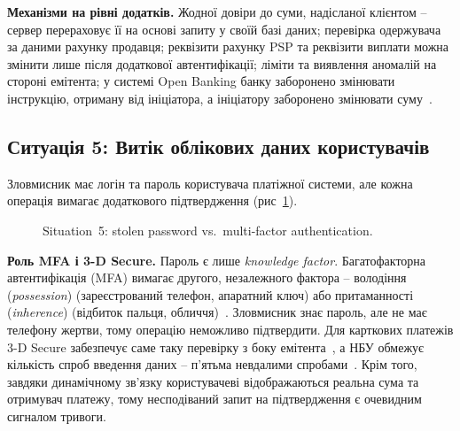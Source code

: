\textbf{Механізми на рівні додатків.} Жодної довіри до суми, надісланої клієнтом -- сервер перераховує її на основі 
запиту у своїй базі даних; перевірка одержувача за даними рахунку продавця; реквізити рахунку PSP та реквізити 
виплати можна змінити лише після додаткової автентифікації; ліміти та виявлення аномалій на стороні емітента; у 
системі Open Banking банку заборонено змінювати інструкцію, отриману від ініціатора, а ініціатору заборонено 
змінювати суму~\cite[п.~27, 35]{nbu80}.

\subsection{Ситуація 5: Витік облікових даних користувачів}
\label{sec:s5}

Зловмисник має логін та пароль користувача платіжної системи, але кожна операція вимагає додаткового підтвердження 
(рис~\ref{fig:s5}).

\begin{figure}[H]
    \centering
    \caption{Situation~5: stolen password vs.\ multi-factor authentication.}
    \label{fig:s5}
\end{figure}

\textbf{Роль MFA і 3-D Secure.} Пароль є лише \emph{knowledge factor}. Багатофакторна автентифікація (MFA) вимагає 
другого, незалежного фактора -- володіння (\emph{possession}) (зареєстрований телефон, апаратний ключ) або 
притаманності (\emph{inherence}) (відбиток пальця, обличчя)~\cite{nist_80063b4, nbu58}. Зловмисник знає пароль, 
але не має телефону жертви, тому операцію неможливо підтвердити. Для карткових платежів 3-D Secure забезпечує саме 
таку перевірку з боку емітента~\cite{emv_3ds}, а НБУ обмежує кількість спроб введення даних -- п'ятьма невдалими 
спробами~\cite[п.~17]{nbu58}. Крім того, завдяки динамічному зв'язку користувачеві відображаються реальна сума та 
отримувач платежу, тому несподіваний запит на підтвердження є очевидним сигналом тривоги.

